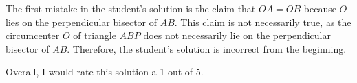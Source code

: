 The first mistake in the student's solution is the claim that $OA = OB$ because $O$ lies on the perpendicular bisector of $AB$. This claim is not necessarily true, as the circumcenter $O$ of triangle $ABP$ does not necessarily lie on the perpendicular bisector of $AB$. Therefore, the student's solution is incorrect from the beginning. 

Overall, I would rate this solution a 1 out of 5.
